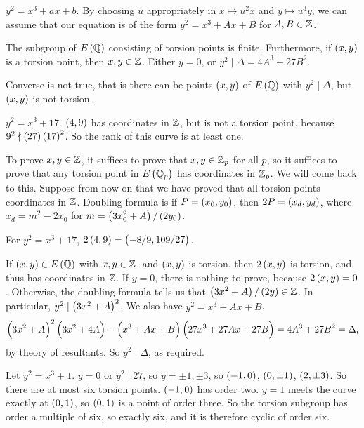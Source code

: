 $ y^2 = x^3 + ax + b $. By choosing $ u $ appropriately in $ x \mapsto u^2x $ and $ y \mapsto u^3y $, we can assume that our equation is of the form $ y^2 = x^3 + Ax + B $ for $ A, B \in \mathbb{Z} $.

\begin{theorem}
The subgroup of $ E\br{\Q} $ consisting of torsion points is finite. Furthermore, if $ \br{x, y} $ is a torsion point, then $ x, y \in \mathbb{Z} $. Either $ y = 0 $, or $ y^2 \mid \Delta = 4A^3 + 27B^2 $.
\end{theorem}

\begin{note*}
Converse is not true, that is there can be points $ \br{x, y} $ of $ E\br{\Q} $ with $ y^2 \mid \Delta $, but $ \br{x, y} $ is not torsion.
\end{note*}

\begin{example*}
$ y^2 = x^3 + 17 $. $ \br{4, 9} $ has coordinates in $ \mathbb{Z} $, but is not a torsion point, because $ 9^2 \nmid \br{27}\br{17}^2 $. So the rank of this curve is at least one.
\end{example*}

To prove $ x, y \in \mathbb{Z} $, it suffices to prove that $ x, y \in \mathbb{Z}_p $ for all $ p $, so it suffices to prove that any torsion point in $ E\br{\Q_p} $ has coordinates in $ \mathbb{Z}_p $. We will come back to this. Suppose from now on that we have proved that all torsion points coordinates in $ \mathbb{Z} $. Doubling formula is if $ P = \br{x_0, y_0} $, then $ 2P = \br{x_d, y_d} $, where $ x_d = m^2 - 2x_0 $ for $ m = \br{3x_0^2 + A} / \br{2y_0} $.

\begin{example*}
For $ y^2 = x^3 + 17 $, $ 2\br{4, 9} = \br{-8 / 9, 109 / 27} $.
\end{example*}

If $ \br{x, y} \in E\br{\Q} $ with $ x, y \in \mathbb{Z} $, and $ \br{x, y} $ is torsion, then $ 2\br{x, y} $ is torsion, and thus has coordinates in $ \mathbb{Z} $. If $ y = 0 $, there is nothing to prove, because $ 2\br{x, y} = 0 $. Otherwise, the doubling formula tells us that $ \br{3x^2 + A} / \br{2y} \in \Z $. In particular, $ y^2 \mid \br{3x^2 + A}^2 $. We also have $ y^2 = x^3 + Ax + B $.
$$ \br{3x^2 + A}^2\br{3x^2 + 4A} - \br{x^3 + Ax + B}\br{27x^3 + 27Ax - 27B} = 4A^3 + 27B^2 = \Delta, $$
by theory of resultants. So $ y^2 \mid \Delta $, as required.

\begin{example*}
Let $ y^2 = x^3 + 1 $. $ y = 0 $ or $ y^2 \mid 27 $, so $ y = \pm 1, \pm 3 $, so $ \br{-1, 0} $, $ \br{0, \pm 1} $, $ \br{2, \pm 3} $. So there are at most six torsion points. $ \br{-1, 0} $ has order two. $ y = 1 $ meets the curve exactly at $ \br{0, 1} $, so $ \br{0, 1} $ is a point of order three. So the torsion subgroup has order a multiple of six, so exactly six, and it is therefore cyclic of order six.
\end{example*}

